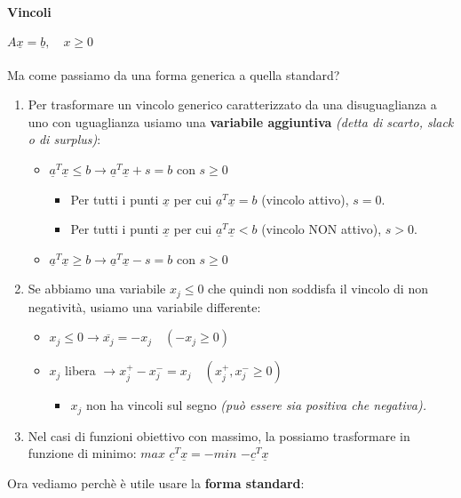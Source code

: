 \documentclass[12pt, twoside, letterpaper]{article}
\newcommand{\vc}[0]{
	\underline{c}
}
\newcommand{\vx}[0]{
	\underline{x}
}
\newcommand{\va}[0]{
	\underline{a}
}
\begin{document}
				\paragraph{Vincoli} $A \vx = \underline{b}, \quad x \geq 0$\\\\
				Ma come passiamo da una forma generica a quella standard?
				
				\begin{enumerate}
					\item Per trasformare un vincolo generico caratterizzato da una disuguaglianza a uno con uguaglianza usiamo una \textbf{variabile aggiuntiva} \textit{(detta di scarto, slack o di surplus)}:
					\begin{itemize}
						\item $\va^T \vx \leq b \rightarrow \va^T \vx + s = b$ con $s \geq 0$ 
							\begin{itemize}
								\item Per tutti i punti $\vx$ per cui $\va^T \vx = b$ (vincolo attivo), $s = 0$.
								\item Per tutti i punti $\vx$ per cui $\va^T \vx < b$ (vincolo NON attivo), $s>0$.
							\end{itemize}
						\item$\va^T \vx \geq b \rightarrow \va^T \vx -s = b$ con $s \geq 0$
					\end{itemize}
					\item Se abbiamo una variabile $x_j \leq 0$ che quindi non soddisfa il vincolo di non negatività, usiamo una variabile differente:
					\begin{itemize}
						\item $x_j \leq 0 \rightarrow \overline{x_j} = -x_j \quad (-x_j \geq 0)$
						\item $x_j$ libera $\rightarrow x_j^+ - x_j^- = x_j \quad (x_j^+, x_j^- \geq 0)$
						\begin{itemize}
							\item $x_j$ non ha vincoli sul segno \textit{(può essere sia positiva che negativa).}
						\end{itemize}
					\end{itemize}
					\item Nel casi di funzioni obiettivo con massimo, la possiamo trasformare in funzione di minimo: $max$ $\vc^T \vx = - min$ $-\vc^T \vx$
				\end{enumerate}
				Ora vediamo perchè è utile usare la \textbf{forma standard}:					
				
\end{document}

